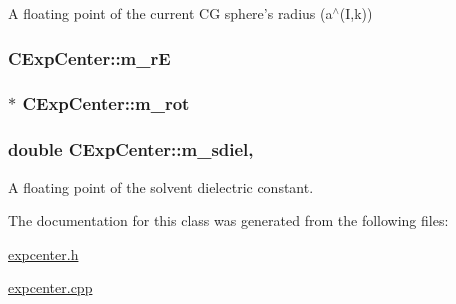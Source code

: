 A floating point of the current C\-G sphere's radius (a$^\wedge$(I,k)) 

\hypertarget{classCExpCenter_a4c494c322b3272097b3b6aadfc2959f6}{
\subsubsection[{m\-\_\-r\-E}]{ C\-Exp\-Center\-::m\-\_\-r\-E\hspace{0.3cm}{\ttfamily [protected]}}}\label{classCExpCenter_a4c494c322b3272097b3b6aadfc2959f6}
\hypertarget{classCExpCenter_a284a13e418738579f101ad9dc0af4dec}{
\subsubsection[{m\-\_\-rot}]{$\ast$ C\-Exp\-Center\-::m\-\_\-rot\hspace{0.3cm}{\ttfamily [protected]}}}\label{classCExpCenter_a284a13e418738579f101ad9dc0af4dec}
\hypertarget{classCExpCenter_a027b6ddd209098aa7f6c71f7b43367b3}{
\subsubsection[{m\-\_\-sdiel}]{\setlength{\rightskip}{0pt plus 5cm}double C\-Exp\-Center\-::m\-\_\-sdiel\hspace{0.3cm}{\ttfamily [static]}, {\ttfamily [protected]}}}\label{classCExpCenter_a027b6ddd209098aa7f6c71f7b43367b3}


A floating point of the solvent dielectric constant. 



The documentation for this class was generated from the following files\-:\begin{DoxyCompactItemize}
\item 
\hyperlink{expcenter_8h}{expcenter.\-h}\item 
\hyperlink{expcenter_8cpp}{expcenter.\-cpp}\end{DoxyCompactItemize}
